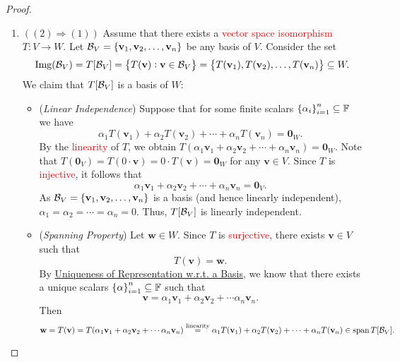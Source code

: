 \documentclass[11pt,openany]{article}
\renewcommand{\vec}[1]{\mathbf{#1}}
\begin{document}
\newpage
{}
\begin{proof}
\begin{enumerate}[]
	\item $((2)\Rightarrow (1))$ Assume that there exists a \textcolor{red}{vector space isomorphism} $T:V\to W$. Let $\basis_V=\set{\vec{v}_1,\vec{v}_2,\dots,\vec{v}_n}$ be any basis of $V$. Consider the set \[
	\img{\basis_V}=T[\basis_V]=\set{T(\vec{v}):\vec{v}\in \basis_V}=\set{T(\vec{v}_1),T(\vec{v}_2),\dots,T(\vec{v}_n)}\subseteq W.
	\] We claim that $T[\mathcal{B}_V]$ is a basis of $W$: \begin{itemize}
		\item (\textit{Linear Independence}) Suppose that for some finite scalars $\set{\alpha_i}_{i=1}^n\subseteq \mathbb{F}$ we have \[
		\alpha_1T(\vec{v}_1)+\alpha_2T(\vec{v}_2)+\cdots+\alpha_nT(\vec{v}_n)=\vec{0}_W.
		\] By the \textcolor{red}{linearity} of $T$, we obtain $T(\alpha_1\vec{v}_1+\alpha_2\vec{v}_2+\cdots+\alpha_n\vec{v}_n)=\vec{0}_W$. Note that $T(\vec{0}_V)=T(0\cdot\vec{v})=0\cdot T(\vec{v})=\vec{0}_W$ for any $\vec{v}\in V$. Since $T$ is \textcolor{red}{injective}, it follows that \[
		\alpha_1\vec{v}_1+\alpha_2\vec{v}_2+\cdots+\alpha_n\vec{v}_n=\vec{0}_V.
		\] As $\basis_V=\set{\vec{v}_1,\vec{v}_2,\dots,\vec{v}_n}$ is a basis (and hence linearly independent), $\alpha_1=\alpha_2=\cdots=\alpha_n=0$. Thus, $T[\mathcal{B}_V]$ is linearly independent.
		\item (\textit{Spanning Property}) Let $\vec{w}\in W$. Since $T$ is \textcolor{red}{surjective}, there exists $\vec{v}\in V$ such that \[
		T(\vec{v})=\vec{w}.
		\] By \hyperlink{unique-wrt-basis}{Uniqueness of Representation w.r.t. a Basis}, we know that there exists a unique scalars $\set{\alpha}_{i=1}^n\subseteq \mathbb{F}$ such that \[
		\vec{v}=\alpha_1\vec{v}_1+\alpha_2\vec{v}_2+\cdots\alpha_n\vec{v}_n.
		\] Then \[
		\vec{w}=T(\vec{v})=T(\alpha_1\vec{v}_1+\alpha_2\vec{v}_2+\cdots\alpha_n\vec{v}_n)\overset{\text{linearity}}{=}\alpha_1 T(\vec{v}_1)+\alpha_2 T(\vec{v}_2) + \cdots +\alpha_n T(\vec{v}_n)\in \Span T[\basis_V].
\]
\end{itemize}
\end{enumerate}
\end{proof}
\end{document}
